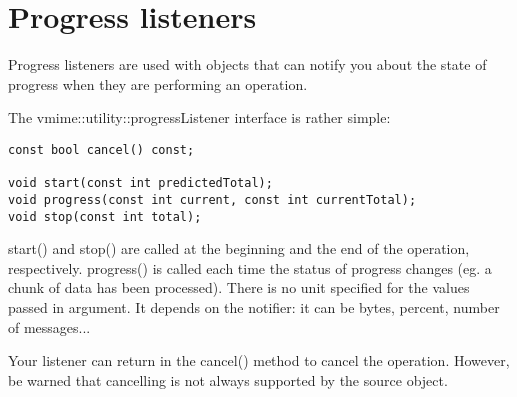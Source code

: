 \section{Progress listeners}

Progress listeners are used with objects that can notify you about the state
of progress when they are performing an operation.

The {\vcode vmime::utility::progressListener} interface is rather simple:

\begin{lstlisting}
const bool cancel() const;

void start(const int predictedTotal);
void progress(const int current, const int currentTotal);
void stop(const int total);
\end{lstlisting}

{\vcode start()} and {\vcode stop()} are called at the beginning and the end
of the operation, respectively. {\vcode progress()} is called each time the
status of progress changes (eg. a chunk of data has been processed). There is
no unit specified for the values passed in argument. It depends on the
notifier: it can be bytes, percent, number of messages...

Your listener can return {\vcode} in the {\vcode cancel()} method to cancel
the operation. However, be warned that cancelling is not always supported by
the source object.

